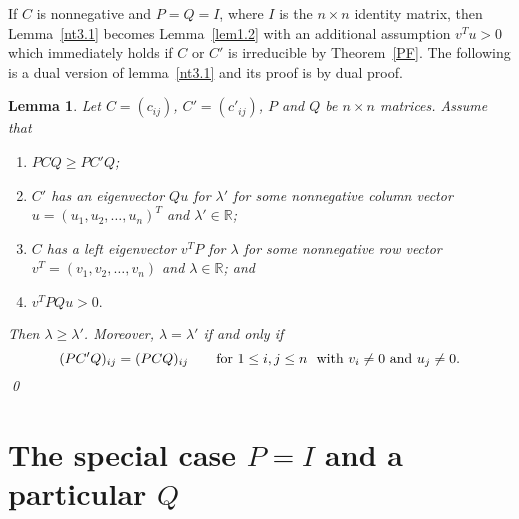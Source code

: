 \documentclass[final,3p, times, 12pt]{elsarticle}
\theoremstyle{plain}
\newtheorem{lem}[thm]{Lemma}
\theoremstyle{definition}
\theoremstyle{remark}
\numberwithin{equation}{section}
\begin{document}
If $C$ is nonnegative and $P=Q=I$, where $I$ is  the $n\times n$ identity matrix, then Lemma~\ref{nt3.1} becomes Lemma~\ref{lem1.2}
with an additional assumption $v^Tu>0$ which immediately holds if $C$ or $C'$ is irreducible by Theorem~\ref{PF}.
The following is a dual version of lemma~\ref{nt3.1} and its proof is by dual proof.





\begin{lem}\label{nt3.1'}
 Let $C=(c_{ij})$, $C'=(c'_{ij})$, $P$ and $Q$ be  $n\times n$ matrices.
Assume that
\begin{enumerate}
\item[(i)]    $PCQ\geq PC'Q$;
\item[(ii)]  $C'$ has an eigenvector $Qu$ for $\lambda'$ for some nonnegative column vector $u=(u_1, u_2, \ldots, u_n)^T$  and $\lambda'\in \mathbb{R}$;
\item[(iii)] $C$ has a left eigenvector $v^TP$ for $\lambda$ for some nonnegative row vector $v^T=(v_1, v_2, \ldots, v_n)$  and  $\lambda\in \mathbb{R}$; and
\item[(iv)] $v^TPQu>0.$
\end{enumerate}
 Then $\lambda\geq \lambda'$.
Moreover, $\lambda=\lambda'$
if and only if
\begin{equation}\label{ne4.1'}
(PC'Q)_{ij}=(PCQ)_{ij}\qquad \hbox{for~}1\leq i, j\leq n~ \hbox{~with~} v_i\ne 0 \hbox{~and~} u_j\ne 0.
\end{equation}\qed
\end{lem}








\section{The special case $P=I$ and a particular $Q$}\label{s2.5}
\end{document}
